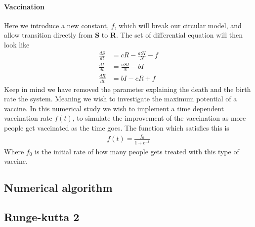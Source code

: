 \documentclass[a4paper, 10pt]{article}
\begin{document}
\paragraph{Vaccination}\label{vaccination}  Here we introduce a new constant, $f$,
which will break our circular model, and allow transition directly from \textbf{S} to
\textbf{R}. The set of differential equation will then look like
\begin{align*}
  \frac{dS}{dt} &= cR - \frac{aSI}{N} - f\\
  \frac{dI}{dt} &= \frac{aSI}{N} - bI \\
  \frac{dR}{dt} &= bI - cR + f
\end{align*}
Keep in mind we have removed the parameter explaining the death and the birth rate the system.
Meaning we wish to investigate the maximum potential of a vaccine.
In this numerical study we wish to implement a time dependent vaccination rate $f(t)$,
to simulate the improvement of the vaccination as more people get vaccinated as the time goes.
The function which satisfies this is
\begin{align}
  f(t) = \frac{f_{0}}{1 + e^{-t}}
\end{align}
Where $f_{0}$ is the initial rate of how many people gets treated with this type of vaccine.

\subsection{Numerical algorithm}
\subsection{Runge-kutta 2}
\end{document}
